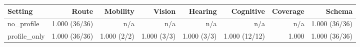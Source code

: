 \begin{tabular}{lrrrrrrr}
\toprule
Setting & Route & Mobility & Vision & Hearing & Cognitive & Coverage & Schema \\
\midrule
no\_profile & 1.000 (36/36) & n/a & n/a & n/a & n/a & n/a & 1.000 (36/36) \\
profile\_only & 1.000 (36/36) & 1.000 (2/2) & 1.000 (3/3) & 1.000 (3/3) & 1.000 (12/12) & 1.000 & 1.000 (36/36) \\
\bottomrule
\end{tabular}
